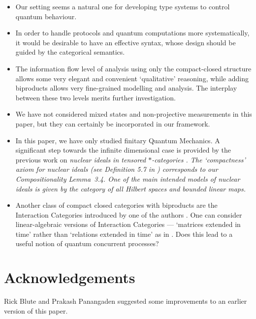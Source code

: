 \documentclass[10pt]{article}
\begin{document}
\begin{itemize}
\item Our setting seems a natural one for developing type systems to
  control quantum behaviour.

\item In order to handle protocols and quantum computations more
  systematically, it would be desirable to have an effective syntax, 
  whose design should be guided by the categorical semantics.

\item The information flow level of analysis using only the
  compact-closed structure allows some very elegant and convenient
  `qualitative' reasoning, while adding biproducts allows very
  fine-grained modelling and analysis. The interplay between these two 
  levels merits further investigation.

\item We have not considered mixed states and non-projective measurements in this paper, but
they
  can certainly be incorporated in our framework.

\item In this paper, we have only studied finitary Quantum Mechanics.
A significant step towards the infinite dimensional case is provided
by the previous work on
\em nuclear ideals in tensored
$*$-categories \em \cite{ABP}.  The `compactness' axiom for nuclear ideals (see
Definition 5.7 in \cite{ABP}) corresponds to
our Compositionality Lemma~3.4. One of the main intended models of
nuclear ideals is given by the category of all Hilbert spaces and
bounded linear maps.


\item Another class of compact closed categories with biproducts are
  the Interaction Categories introduced by one of the authors
  \cite{Abramsky}. One can consider linear-algebraic versions of
  Interaction Categories --- `matrices extended in time' rather than
  `relations extended in time' as in \cite{Abramsky}. Does this lead to a 
  useful notion of quantum concurrent processes?

\end{itemize}

\section*{Acknowledgements}  

Rick Blute and Prakash Panangaden suggested some improvements to an
earlier version of this paper.
\end{document}
